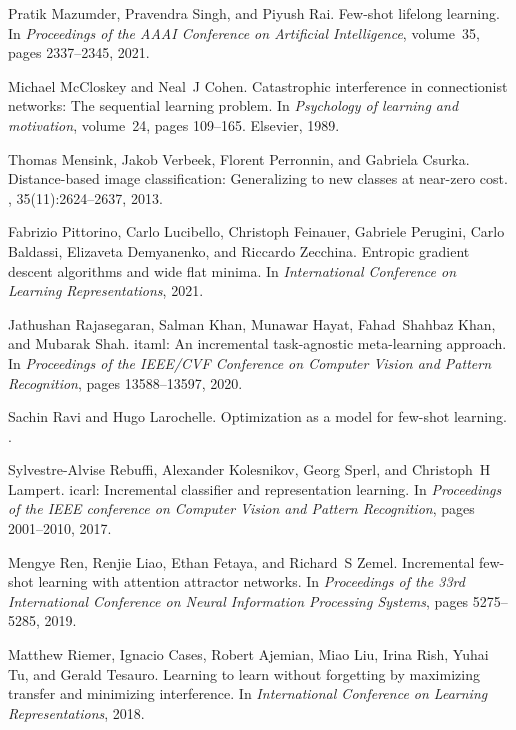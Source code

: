 \documentclass{article}
\begin{document}
\begin{thebibliography}{10}
Pratik Mazumder, Pravendra Singh, and Piyush Rai.
\newblock Few-shot lifelong learning.
\newblock In {\em Proceedings of the AAAI Conference on Artificial
  Intelligence}, volume~35, pages 2337--2345, 2021.

Michael McCloskey and Neal~J Cohen.
\newblock Catastrophic interference in connectionist networks: The sequential
  learning problem.
\newblock In {\em Psychology of learning and motivation}, volume~24, pages
  109--165. Elsevier, 1989.

Thomas Mensink, Jakob Verbeek, Florent Perronnin, and Gabriela Csurka.
\newblock Distance-based image classification: Generalizing to new classes at
  near-zero cost.
,
  35(11):2624--2637, 2013.

Fabrizio Pittorino, Carlo Lucibello, Christoph Feinauer, Gabriele Perugini,
  Carlo Baldassi, Elizaveta Demyanenko, and Riccardo Zecchina.
\newblock Entropic gradient descent algorithms and wide flat minima.
\newblock In {\em International Conference on Learning Representations}, 2021.

Jathushan Rajasegaran, Salman Khan, Munawar Hayat, Fahad~Shahbaz Khan, and
  Mubarak Shah.
\newblock itaml: An incremental task-agnostic meta-learning approach.
\newblock In {\em Proceedings of the IEEE/CVF Conference on Computer Vision and
  Pattern Recognition}, pages 13588--13597, 2020.

Sachin Ravi and Hugo Larochelle.
\newblock Optimization as a model for few-shot learning.
.

Sylvestre-Alvise Rebuffi, Alexander Kolesnikov, Georg Sperl, and Christoph~H
  Lampert.
\newblock icarl: Incremental classifier and representation learning.
\newblock In {\em Proceedings of the IEEE conference on Computer Vision and
  Pattern Recognition}, pages 2001--2010, 2017.

Mengye Ren, Renjie Liao, Ethan Fetaya, and Richard~S Zemel.
\newblock Incremental few-shot learning with attention attractor networks.
\newblock In {\em Proceedings of the 33rd International Conference on Neural
  Information Processing Systems}, pages 5275--5285, 2019.

Matthew Riemer, Ignacio Cases, Robert Ajemian, Miao Liu, Irina Rish, Yuhai Tu,
  and Gerald Tesauro.
\newblock Learning to learn without forgetting by maximizing transfer and
  minimizing interference.
\newblock In {\em International Conference on Learning Representations}, 2018.


\end{thebibliography}
\end{document}
